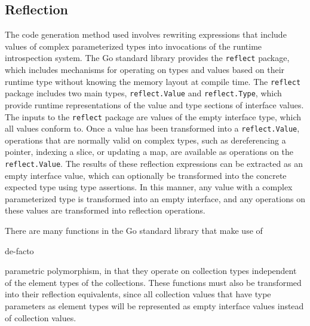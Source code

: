 \documentclass[letterpaper,twocolumn,11pt]{article}
\begin{document}
\subsection{Reflection} \label{reflection}

The code generation method used involves rewriting expressions that include values of complex parameterized types into invocations of the runtime introspection system. The Go standard library provides the \texttt{reflect} package, which includes mechanisms for operating on types and values based on their runtime type without knowing the memory layout at compile time. The \texttt{reflect} package includes two main types, \texttt{reflect.Value} and \texttt{reflect.Type}, which provide runtime representations of the value and type sections of interface values. The inputs to the \texttt{reflect} package are values of the empty interface type, which all values conform to. Once a value has been transformed into a \texttt{reflect.Value}, operations that are normally valid on complex types, such as dereferencing a pointer, indexing a slice, or updating a map, are available as operations on the \texttt{reflect.Value}. The results of these reflection expressions can be extracted as an empty interface value, which can optionally be transformed into the concrete expected type using type assertions. In this manner, any value with a complex parameterized type is transformed into an empty interface, and any operations on these values are transformed into reflection operations.

There are many functions in the Go standard library that make use of \begin{em}de-facto\end{em} parametric polymorphism, in that they operate on collection types independent of the element types of the collections. These functions must also be transformed into their reflection equivalents, since all collection values that have type parameters as element types will be represented as empty interface values instead of collection values.
\end{document}
